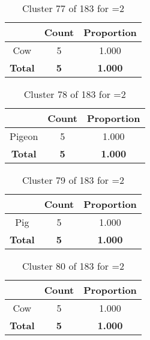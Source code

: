 \begin{table}[ht!]
\centering
\begin{tabular}{|c|c|c|}
\hline
\bf \Spec{} &\bf Count &\bf Proportion\\ \hline \hline
Cow & 5 & 1.000\\ \hline
\hline
\bf Total & \bf 5 & \bf 1.000\\ \hline
\end{tabular}
\label{tab:cluster:77:2}
\caption{Cluster 77 of 183 for \minneigh{}=2}
\end{table}

\begin{table}[ht!]
\centering
\begin{tabular}{|c|c|c|}
\hline
\bf \Spec{} &\bf Count &\bf Proportion\\ \hline \hline
Pigeon & 5 & 1.000\\ \hline
\hline
\bf Total & \bf 5 & \bf 1.000\\ \hline
\end{tabular}
\label{tab:cluster:78:2}
\caption{Cluster 78 of 183 for \minneigh{}=2}
\end{table}

\begin{table}[ht!]
\centering
\begin{tabular}{|c|c|c|}
\hline
\bf \Spec{} &\bf Count &\bf Proportion\\ \hline \hline
Pig & 5 & 1.000\\ \hline
\hline
\bf Total & \bf 5 & \bf 1.000\\ \hline
\end{tabular}
\label{tab:cluster:79:2}
\caption{Cluster 79 of 183 for \minneigh{}=2}
\end{table}

\clearpage
\begin{table}[ht!]
\centering
\begin{tabular}{|c|c|c|}
\hline
\bf \Spec{} &\bf Count &\bf Proportion\\ \hline \hline
Cow & 5 & 1.000\\ \hline
\hline
\bf Total & \bf 5 & \bf 1.000\\ \hline
\end{tabular}
\label{tab:cluster:80:2}
\caption{Cluster 80 of 183 for \minneigh{}=2}
\end{table}

